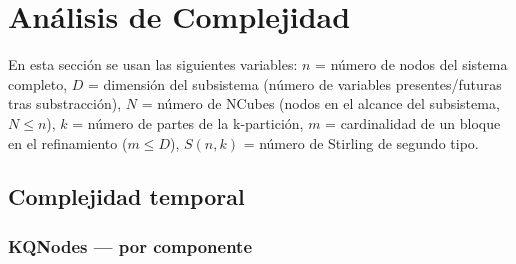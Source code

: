 
\section{Análisis de Complejidad}

En esta sección se usan las siguientes variables:
$n$ = número de nodos del sistema completo,
$D$ = dimensión del subsistema (número de variables presentes/futuras tras substracción),
$N$ = número de NCubes (nodos en el alcance del subsistema, $N \leq n$),
$k$ = número de partes de la k-partición,
$m$ = cardinalidad de un bloque en el refinamiento ($m \leq D$),
$S(n,k)$ = número de Stirling de segundo tipo.

\subsection{Complejidad temporal}

\subsubsection*{KQNodes — por componente}

